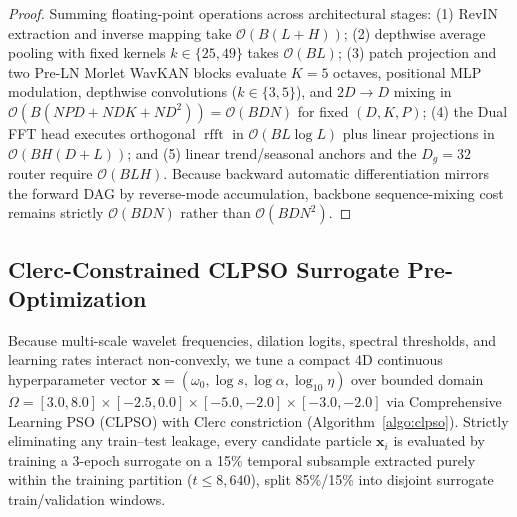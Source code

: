 \documentclass[pdflatex,sn-mathphys-num,referee,lineno]{sn-jnl}
\theoremstyle{thmstyleone}
\theoremstyle{thmstyletwo}
\theoremstyle{thmstylethree}
\begin{document}
\begin{proof}
Summing floating-point operations across architectural stages: (1) RevIN extraction and inverse mapping take $\mathcal{O}(B(L+H))$; (2) depthwise average pooling with fixed kernels $k \in \{25, 49\}$ takes $\mathcal{O}(B L)$; (3) patch projection and two Pre-LN Morlet WavKAN blocks evaluate $K=5$ octaves, positional MLP modulation, depthwise convolutions ($k \in \{3, 5\}$), and $2D \to D$ mixing in $\mathcal{O}(B(N P D + N D K + N D^2)) = \mathcal{O}(B D N)$ for fixed $(D, K, P)$; (4) the Dual FFT head executes orthogonal $\operatorname{rfft}$ in $\mathcal{O}(B L \log L)$ plus linear projections in $\mathcal{O}(B H (D + L))$; and (5) linear trend/seasonal anchors and the $D_g=32$ router require $\mathcal{O}(B L H)$. Because backward automatic differentiation mirrors the forward DAG by reverse-mode accumulation, backbone sequence-mixing cost remains strictly $\mathcal{O}(B D N)$ rather than $\mathcal{O}(B D N^2)$.
\end{proof}

\subsection{Clerc-Constrained CLPSO Surrogate Pre-Optimization}\label{subsec:clpso}
Because multi-scale wavelet frequencies, dilation logits, spectral thresholds, and learning rates interact non-convexly, we tune a compact 4D continuous hyperparameter vector $\mathbf{x} = (\omega_0, \log s, \log\alpha, \log_{10}\eta)$ over bounded domain $\Omega = [3.0, 8.0] \times [-2.5, 0.0] \times [-5.0, -2.0] \times [-3.0, -2.0]$ via Comprehensive Learning PSO (CLPSO) \cite{liang2006clpso} with Clerc constriction \cite{clerc2002constriction} (Algorithm~\ref{algo:clpso}). Strictly eliminating any train--test leakage, every candidate particle $\mathbf{x}_i$ is evaluated by training a 3-epoch surrogate on a 15\% temporal subsample extracted purely within the training partition ($t \le 8,640$), split 85\%/15\% into disjoint surrogate train/validation windows.
\end{document}
